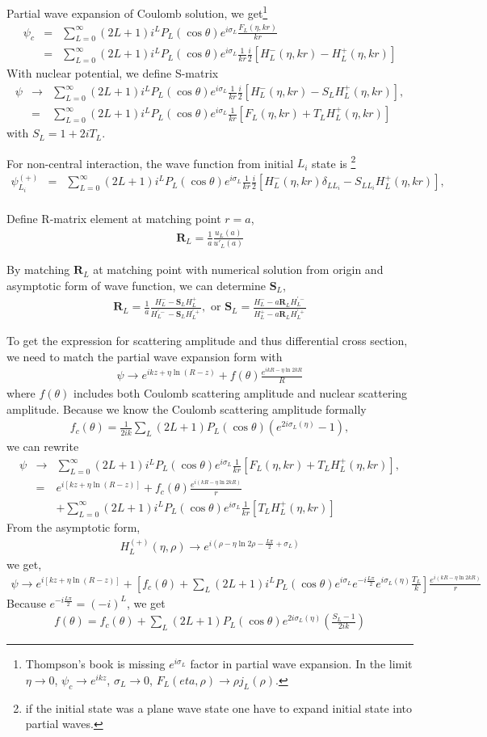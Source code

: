 \documentclass[10pt]{book}
\def\bm{\boldsymbol}
\newcommand{\bea}{\begin{eqnarray}}
\newcommand{\eea}{\end{eqnarray}}
\newcommand{\no}{\nonumber \\}
\begin{document}
Partial wave expansion of Coulomb solution, we get\footnote{ 
Thompson's book is missing $e^{i\sigma_L}$ factor in partial wave expansion.
In the limit $\eta\to 0$, $\psi_c\to e^{ikz}$, $\sigma_L\to 0$,
$F_L(eta,\rho)\to\rho j_L(\rho)$.
 }
\bea
\psi_c&=&\sum_{L=0}^\infty (2L+1) i^L P_L(\cos\theta)
                   e^{i\sigma_L} \frac{F_L(\eta,kr)}{kr} \no
       &=&\sum_{L=0}^\infty (2L+1) i^L P_L(\cos\theta) e^{i\sigma_L}
          \frac{1}{kr}\frac{i}{2}[H_L^{-}(\eta,kr)-H_L^{+}(\eta,kr)]        
\eea
With nuclear potential, we define S-matrix
\bea
\psi&\to& \sum_{L=0}^\infty (2L+1) i^L P_L(\cos\theta)e^{i\sigma_L}\frac{1}{kr}
          \frac{i}{2}[H_L^{-}(\eta,kr)-S_L H_L^{+}(\eta,kr)],\no 
    &=& \sum_{L=0}^\infty (2L+1) i^L P_L(\cos\theta)e^{i\sigma_L}\frac{1}{kr}
              [F_L(\eta,kr)+T_L H_L^{+}(\eta,kr)]              
\eea
with $S_L=1+2i T_L$.

For non-central interaction, the wave function from initial $L_i$ state is
\footnote{if the initial state was a plane wave state 
one have to expand initial state into partial waves.
} 
\bea
\psi_{L_i}^{(+)}&=& \sum_{L=0}^\infty (2L+1) i^L P_L(\cos\theta)e^{i\sigma_L}\frac{1}{kr}
          \frac{i}{2}[H_L^{-}(\eta,kr)\delta_{LL_i}-S_{LL_i} H_L^{+}(\eta,kr)],\no 
\eea

Define R-matrix element at matching point $r=a$,
\bea
{\bm R}_L=\frac{1}{a}\frac{u_L(a)}{u'_L(a)}
\eea

By matching ${\bm R}_L$ at matching point with numerical
solution from origin and asymptotic form of wave function,
we can determine ${\bm S}_L$, 
\bea
{\bm R}_L=\frac{1}{a}
 \frac{H_{L}^- - {\bm S}_L H_L^+}{H_{L}^{'-} - {\bm S}_L H_L^{'+}},
 \mbox{ or }
{\bm S}_L =\frac{ H^-_L - a {\bm R}_L H^{'-}_L}
            {H^+_L - a {\bm R}_L H^{'+}_L} 
\eea

To get the expression for scattering amplitude and thus differential cross section, 
we need to match the partial wave expansion form with
\bea 
\psi\to e^{ik z+\eta\ln(R-z)}+f(\theta)\frac{e^{ikR-\eta\ln 2kR}}{R}
\eea 
where $f(\theta)$ includes both Coulomb scattering amplitude 
and nuclear scattering amplitude. Because we know the Coulomb scattering 
amplitude formally
\bea 
f_c(\theta)=\frac{1}{2ik}\sum_{L}(2L+1)P_L(\cos\theta)(e^{2i\sigma_L(\eta)}-1),
\eea 
we can rewrite
\bea
\psi&\to& \sum_{L=0}^\infty (2L+1) i^L P_L(\cos\theta)e^{i\sigma_L}\frac{1}{kr}
              [F_L(\eta,kr)+T_L H_L^{+}(\eta,kr)],\no 
    &=& e^{i[k z+\eta\ln(R-z)]}+f_c(\theta)\frac{e^{i(kR-\eta\ln 2kR)}}{r} 
        \no & &        
    +\sum_{L=0}^\infty (2L+1) i^L P_L(\cos\theta)e^{i\sigma_L} \frac{1}{kr}
                  [T_L H_L^{+}(\eta,kr)]
\eea
From the asymptotic form,
\bea 
H_L^{(+)}(\eta,\rho)\to e^{i(\rho-\eta\ln 2\rho-\frac{L\pi}{2}+\sigma_L)} 
\eea 
we get,
\bea 
\psi\to e^{i[k z+\eta\ln(R-z)]}+\left[ f_c(\theta)+\sum_L (2L+1) i^L P_L(\cos\theta)
e^{i\sigma_L} e^{-i\frac{L\pi}{2}} e^{i\sigma_L(\eta)}\frac{T_L}{k}\right]\frac{e^{i(kR-\eta\ln 2kR)}}{r}  
\eea 
Because $e^{-i\frac{L\pi}{2}}=(-i)^L$, we get
\bea 
f(\theta)=f_c(\theta)+\sum_L (2L+1) P_L(\cos\theta) e^{2i\sigma_L(\eta)}\left(\frac{S_L-1}{2ik}\right) 
\eea 
\end{document}
